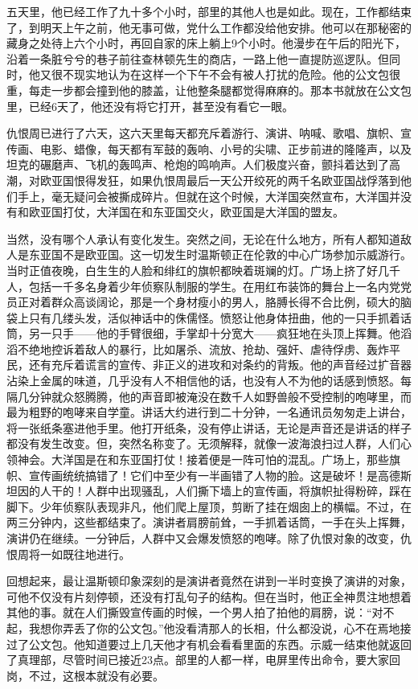 五天里，他已经工作了九十多个小时，部里的其他人也是如此。现在，工作都结束了，到明天上午之前，他无事可做，党什么工作都没给他安排。他可以在那秘密的藏身之处待上六个小时，再回自家的床上躺上9个小时。他漫步在午后的阳光下，沿着一条脏兮兮的巷子前往查林顿先生的商店，一路上他一直提防巡逻队。但同时，他又很不现实地认为在这样一个下午不会有被人打扰的危险。他的公文包很重，每走一步都会撞到他的膝盖，让他整条腿都觉得麻麻的。那本书就放在公文包里，已经6天了，他还没有将它打开，甚至没有看它一眼。

仇恨周已进行了六天，这六天里每天都充斥着游行、演讲、呐喊、歌唱、旗帜、宣传画、电影、蜡像，每天都有军鼓的轰响、小号的尖啸、正步前进的隆隆声，以及坦克的碾磨声、飞机的轰鸣声、枪炮的鸣响声。人们极度兴奋，颤抖着达到了高潮，对欧亚国恨得发狂，如果仇恨周最后一天公开绞死的两千名欧亚国战俘落到他们手上，毫无疑问会被撕成碎片。但就在这个时候，大洋国突然宣布，大洋国并没有和欧亚国打仗，大洋国在和东亚国交火，欧亚国是大洋国的盟友。

当然，没有哪个人承认有变化发生。突然之间，无论在什么地方，所有人都知道敌人是东亚国不是欧亚国。这一切发生时温斯顿正在伦敦的中心广场参加示威游行。当时正值夜晚，白生生的人脸和绯红的旗帜都映着斑斓的灯。广场上挤了好几千人，包括一千多名身着少年侦察队制服的学生。在用红布装饰的舞台上一名内党党员正对着群众高谈阔论，那是一个身材瘦小的男人，胳膊长得不合比例，硕大的脑袋上只有几缕头发，活似神话中的侏儒怪。愤怒让他身体扭曲，他的一只手抓着话筒，另一只手------他的手臂很细，手掌却十分宽大------疯狂地在头顶上挥舞。他滔滔不绝地控诉着敌人的暴行，比如屠杀、流放、抢劫、强奸、虐待俘虏、轰炸平民，还有充斥着谎言的宣传、非正义的进攻和对条约的背叛。他的声音经过扩音器沾染上金属的味道，几乎没有人不相信他的话，也没有人不为他的话感到愤怒。每隔几分钟就众怒腾腾，他的声音即被淹没在数千人如野兽般不受控制的咆哮里，而最为粗野的咆哮来自学童。讲话大约进行到二十分钟，一名通讯员匆匆走上讲台，将一张纸条塞进他手里。他打开纸条，没有停止讲话，无论是声音还是讲话的样子都没有发生改变。但，突然名称变了。无须解释，就像一波海浪扫过人群，人们心领神会。大洋国是在和东亚国打仗！接着便是一阵可怕的混乱。广场上，那些旗帜、宣传画统统搞错了！它们中至少有一半画错了人物的脸。这是破坏！是高德斯坦因的人干的！人群中出现骚乱，人们撕下墙上的宣传画，将旗帜扯得粉碎，踩在脚下。少年侦察队表现非凡，他们爬上屋顶，剪断了挂在烟囱上的横幅。不过，在两三分钟内，这些都结束了。演讲者肩膀前耸，一手抓着话筒，一手在头上挥舞，演讲仍在继续。一分钟后，人群中又会爆发愤怒的咆哮。除了仇恨对象的改变，仇恨周将一如既往地进行。

回想起来，最让温斯顿印象深刻的是演讲者竟然在讲到一半时变换了演讲的对象，可他不仅没有片刻停顿，还没有打乱句子的结构。但在当时，他正全神贯注地想着其他的事。就在人们撕毁宣传画的时候，一个男人拍了拍他的肩膀，说：``对不起，我想你弄丢了你的公文包。''他没看清那人的长相，什么都没说，心不在焉地接过了公文包。他知道要过上几天他才有机会看看里面的东西。示威一结束他就返回了真理部，尽管时间已接近23点。部里的人都一样，电屏里传出命令，要大家回岗，不过，这根本就没有必要。

